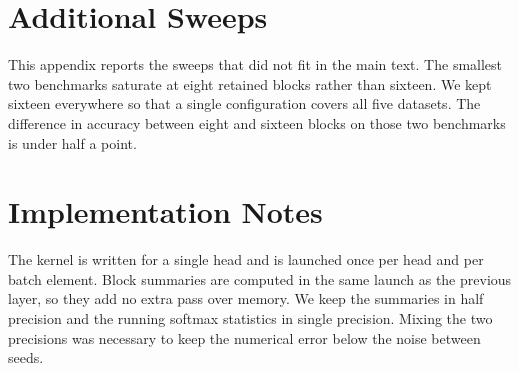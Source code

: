 \documentclass[10pt,twocolumn,a4paper]{article}
\newcommand{\s}[1]{#1}
\begin{document}
\section{Additional Sweeps}

\s{This appendix reports the sweeps that did not fit in the main text.}
\s{The smallest two benchmarks saturate at eight retained blocks rather than sixteen.}
\s{We kept sixteen everywhere so that a single configuration covers all five datasets.}
\s{The difference in accuracy between eight and sixteen blocks on those two benchmarks is under half a point.}

\section{Implementation Notes}

\s{The kernel is written for a single head and is launched once per head and per batch element.}
\s{Block summaries are computed in the same launch as the previous layer, so they add no extra pass over memory.}
\s{We keep the summaries in half precision and the running softmax statistics in single precision.}
\s{Mixing the two precisions was necessary to keep the numerical error below the noise between seeds.}
\end{document}
